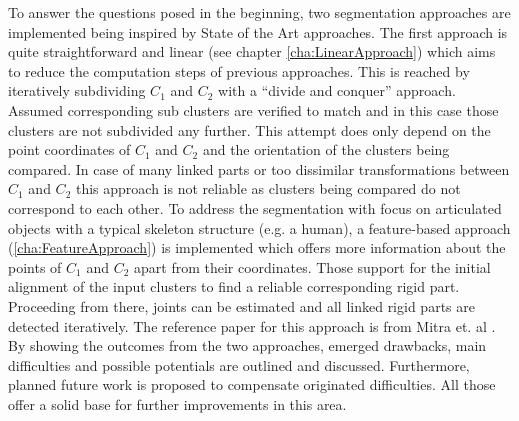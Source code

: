 To answer the questions posed in the beginning, two segmentation approaches are implemented being inspired by State of the Art approaches. The first approach is quite straightforward and linear (see chapter \ref{cha:LinearApproach}) which aims to reduce the computation steps of previous approaches. This is reached by iteratively subdividing $C_1$ and $C_2$ with a ``divide and conquer'' approach. Assumed corresponding sub clusters are verified to match and in this case those clusters are not subdivided any further. This attempt does only depend on the point coordinates of $C_1$ and $C_2$ and the orientation of the clusters being compared. In case of many linked parts or too dissimilar transformations between $C_1$ and $C_2$ this approach is not reliable as clusters being compared do not correspond to each other. To address the segmentation with focus on articulated objects with a typical skeleton structure (e.g. a human), a feature-based approach (\ref{cha:FeatureApproach}) is implemented which offers more information about the points of $C_1$ and $C_2$ apart from their coordinates. Those support for the initial alignment of the input clusters to find a reliable corresponding rigid part. Proceeding from there, joints can be estimated and all linked rigid parts are detected iteratively. The reference paper for this approach is from Mitra et. al \cite{Mitra07}. By showing the outcomes from the two approaches, emerged drawbacks, main difficulties and possible potentials are outlined and discussed. Furthermore, planned future work is proposed to compensate originated difficulties. All those offer a solid base for further improvements in this area. 




